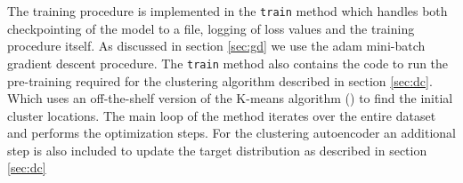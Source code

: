 The training procedure is implemented in the \lstinline{train} method which handles both checkpointing of the model to a file, logging of loss values and the training procedure itself. As discussed in section \ref{sec:gd} we use the adam mini-batch gradient descent procedure. The \lstinline{train} method also contains the code to run the pre-training required for the clustering algorithm described in section \ref{sec:dc}. Which uses an off-the-shelf version of the K-means algorithm () to find the initial cluster locations. The main loop of the method iterates over the entire dataset and performs the optimization steps. For the clustering autoencoder an additional step is also included to update the target distribution as described in section \ref{sec:dc}
